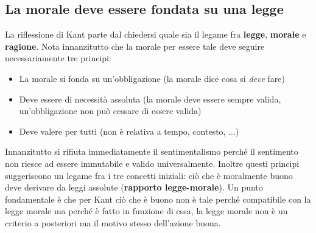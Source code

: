 \documentclass[10pt,a4paper]{article}
\begin{document}
\subsection{La morale deve essere fondata su una legge}
La riflessione di Kant parte dal chiedersi quale sia il legame fra \textbf{legge}, \textbf{morale} e \textbf{ragione}. Nota innanzitutto che la morale per essere tale deve seguire necessariamente tre principi:
\begin{itemize}
	\item La morale si fonda su un'obbligazione (la morale dice cosa si \textit{deve} fare)
	\item Deve essere di necessità assoluta (la morale deve essere sempre valida, un'obbligazione non può cessare di essere valida)
	\item Deve valere per tutti (non è relativa a tempo, contesto, ...)
\end{itemize} 
Innanzitutto si rifiuta immediatamente il sentimentalismo perché il sentimento non riesce ad essere immutabile e valido universalmente. Inoltre questi principi suggeriscono un legame fra i tre concetti iniziali: ciò che è moralmente buono deve derivare da leggi assolute (\textbf{rapporto legge-morale}). Un punto fondamentale è che per Kant ciò che è buono non è tale perché compatibile con la legge morale ma perché è fatto in funzione di essa, la legge morale non è un criterio a posteriori ma il motivo stesso dell'azione buona.\\
\end{document}
